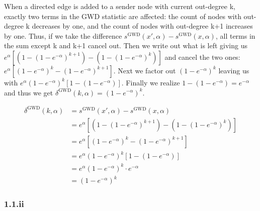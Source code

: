\documentclass[
]{article}
\begin{document}
When a directed edge is added to a sender node with current out-degree
k, exactly two terms in the GWD statistic are affected: the count of
nodes with out-degree k decreases by one, and the count of nodes with
out-degree k+1 increases by one. Thus, if we take the difference
\(s^{\text{GWD}}(x', \alpha) - s^{\text{GWD}}(x, \alpha)\), all terms in
the sum except k and k+1 cancel out. Then we write out what is left
giving us
\(e^\alpha \left[ \left(1 - \left(1 - e^{-\alpha}\right)^{k+1}\right) - \left(1 - \left(1 - e^{-\alpha}\right)^{k}\right) \right]\)
and cancel the two ones:
\(e^\alpha \left[ \left(1 - e^{-\alpha}\right)^{k} - \left(1 - e^{-\alpha}\right)^{k+1} \right]\).
Next we factor out \(\left(1 - e^{-\alpha}\right) ^{k}\) leaving us with
\(e^\alpha \left(1 - e^{-\alpha}\right)^{k} \left[ 1 - \left(1 - e^{-\alpha}\right) \right]\).
Finally we realize \(1 - \left(1 - e^{-\alpha}\right) = e^{-\alpha}\)
and thus we get
\(\delta^{\text{GWD}}(k, \alpha) = \left(1 - e^{-\alpha}\right)^{k}\).

\begin{align*}
\delta^{\text{GWD}}(k, \alpha) &= s^{\text{GWD}}(x', \alpha) - s^{\text{GWD}}(x, \alpha) \\
&= e^\alpha \left[ \left(1 - \left(1 - e^{-\alpha}\right)^{k+1}\right) - \left(1 - \left(1 - e^{-\alpha}\right)^{k}\right) \right] \\
&= e^\alpha \left[ \left(1 - e^{-\alpha}\right)^{k} - \left(1 - e^{-\alpha}\right)^{k+1} \right] \\
&= e^\alpha \left(1 - e^{-\alpha}\right)^{k} \left[ 1 - \left(1 - e^{-\alpha}\right) \right] \\
&= e^\alpha \left(1 - e^{-\alpha}\right)^{k} \cdot e^{-\alpha} \\
&= \boxed{\left(1 - e^{-\alpha}\right)^{k}}
\end{align*}

\subsubsection{1.1.ii}\label{ii}
\end{document}
